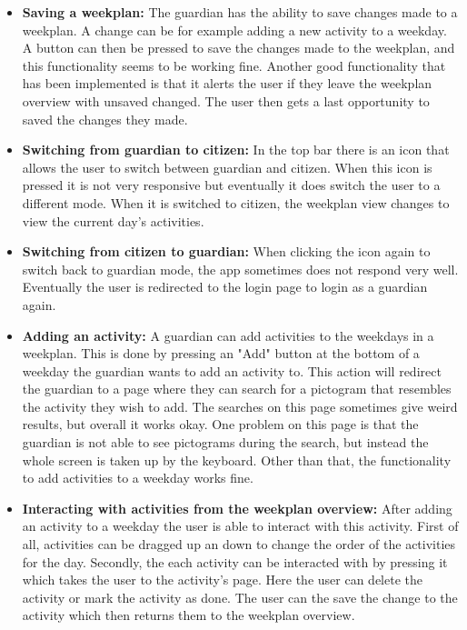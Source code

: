 \begin{itemize}
    \\
    \item \textbf{Saving a weekplan:} The guardian has the ability to save changes made to a weekplan. A change can be for example adding a new activity to a weekday. 
    A button can then be pressed to save the changes made to the weekplan, and this functionality seems to be working fine.
    Another good functionality that has been implemented is that it alerts the user if they leave the weekplan overview with unsaved changed. The user then gets a last opportunity to saved the changes they made.
    \\
    \item \textbf{Switching from guardian to citizen:} In the top bar there is an icon that allows the user to switch between guardian and citizen. 
    When this icon is pressed it is not very responsive but eventually it does switch the user to a different mode. 
    When it is switched to citizen, the weekplan view changes to view the current day's activities.
    \\
    \item \textbf{Switching from citizen to guardian:} When clicking the icon again to switch back to guardian mode, the app sometimes does not respond very well. 
    Eventually the user is redirected to the login page to login as a guardian again.
    \\
    \item \textbf{Adding an activity:} A guardian can add activities to the weekdays in a weekplan. This is done by pressing an "Add" button at the bottom of a weekday the guardian wants to add an activity to.
    This action will redirect the guardian to a page where they can search for a pictogram that resembles the activity they wish to add. The searches on this page sometimes give weird results, but overall it works okay.
    One problem on this page is that the guardian is not able to see pictograms during the search, but instead the whole screen is taken up by the keyboard. 
    Other than that, the functionality to add activities to a weekday works fine.
    \\
    \item \textbf{Interacting with activities from the weekplan overview:} After adding an activity to a weekday the user is able to interact with this activity. 
    First of all, activities can be dragged up an down to change the order of the activities for the day. 
    Secondly, the each activity can be interacted with by pressing it which takes the user to the activity's page. 
    Here the user can delete the activity or mark the activity as done. The user can the save the change to the activity which then returns them to the weekplan overview.
    \\
\end{itemize}
